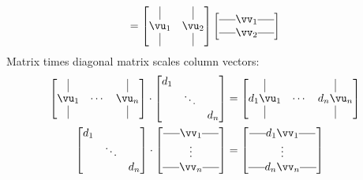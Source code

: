 \documentclass[a4paper,11pt]{exam}
\newcounter{ct}
\newcommand{\horzbar}{\rule[.5ex]{1.5em}{0.4pt}}
\begin{document}
\begin{questions}
\begin{tcolorbox}[colback=black!1!,title=Matrix Fun Facts]
\begin{align}
    =
    \begin{bmatrix}
	\kern.3em\vline\kern.3em
	&
	\kern.3em\vline\kern.3em
	\\
	\vu_1 & \vu_2 \\
	\kern.3em\vline\kern.3em
	&
	\kern.3em\vline\kern.3em
    \end{bmatrix}
    \begin{bmatrix}
	\horzbar \vv_1 \horzbar \\
	\horzbar \vv_2 \horzbar
    \end{bmatrix}
\end{align}
%
Matrix times diagonal matrix scales column vectors:
\begin{align}
    \begin{bmatrix}
	\kern.3em\vline\kern.3em
	&
	&
	\kern.3em\vline\kern.3em
	\\
	\vu_1 & \cdots & \vu_n \\
	\kern.3em\vline\kern.3em
	&
	&
	\kern.3em\vline\kern.3em
    \end{bmatrix}
    \cdot
    \begin{bmatrix}
	d_1 & & \\
	    & \ddots & \\
	    & & d_n
    \end{bmatrix}
    &=
    \begin{bmatrix}
	\kern.3em\vline\kern.3em
	&
	&
	\kern.3em\vline\kern.3em
	\\
	d_1 \vu_1 & \cdots & d_n \vu_n \\
	\kern.3em\vline\kern.3em
	&
	&
	\kern.3em\vline\kern.3em
    \end{bmatrix}
    \\
    \begin{bmatrix}
	d_1 & & \\
	    & \ddots & \\
	    & & d_n
    \end{bmatrix}
    \cdot
    \begin{bmatrix}
	\horzbar \vv_1 \horzbar \\
	\vdots \\
	\horzbar \vv_n \horzbar
    \end{bmatrix}
    &=
    \begin{bmatrix}
	\horzbar d_1 \vv_1 \horzbar \\
	\vdots \\
	\horzbar d_n \vv_n \horzbar
    \end{bmatrix}
\end{align}
\end{tcolorbox}


\end{questions}
\end{document}
